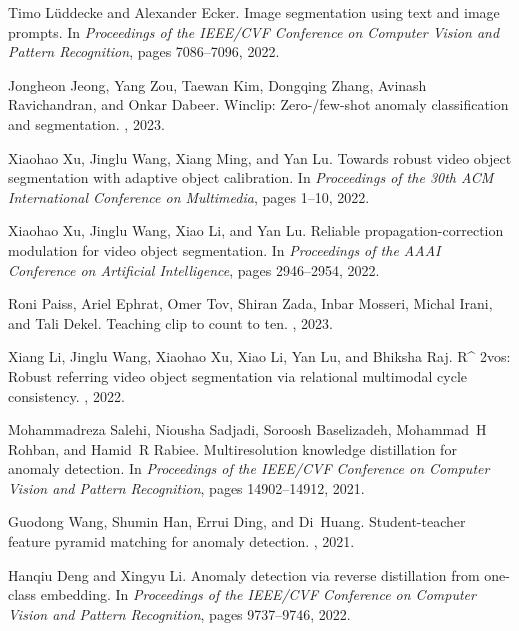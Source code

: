 \documentclass{article}
\begin{document}
{\begin{thebibliography}{10}
Timo L{\"u}ddecke and Alexander Ecker.
\newblock Image segmentation using text and image prompts.
\newblock In {\em Proceedings of the IEEE/CVF Conference on Computer Vision and
  Pattern Recognition}, pages 7086--7096, 2022.

Jongheon Jeong, Yang Zou, Taewan Kim, Dongqing Zhang, Avinash Ravichandran, and
  Onkar Dabeer.
\newblock Winclip: Zero-/few-shot anomaly classification and segmentation.
, 2023.

Xiaohao Xu, Jinglu Wang, Xiang Ming, and Yan Lu.
\newblock Towards robust video object segmentation with adaptive object
  calibration.
\newblock In {\em Proceedings of the 30th ACM International Conference on
  Multimedia}, pages 1--10, 2022.

Xiaohao Xu, Jinglu Wang, Xiao Li, and Yan Lu.
\newblock Reliable propagation-correction modulation for video object
  segmentation.
\newblock In {\em Proceedings of the AAAI Conference on Artificial
  Intelligence}, pages 2946--2954, 2022.

Roni Paiss, Ariel Ephrat, Omer Tov, Shiran Zada, Inbar Mosseri, Michal Irani,
  and Tali Dekel.
\newblock Teaching clip to count to ten.
, 2023.

Xiang Li, Jinglu Wang, Xiaohao Xu, Xiao Li, Yan Lu, and Bhiksha Raj.
\newblock R\^{} 2vos: Robust referring video object segmentation via relational
  multimodal cycle consistency.
, 2022.

Mohammadreza Salehi, Niousha Sadjadi, Soroosh Baselizadeh, Mohammad~H Rohban,
  and Hamid~R Rabiee.
\newblock Multiresolution knowledge distillation for anomaly detection.
\newblock In {\em Proceedings of the IEEE/CVF Conference on Computer Vision and
  Pattern Recognition}, pages 14902--14912, 2021.

Guodong Wang, Shumin Han, Errui Ding, and Di~Huang.
\newblock Student-teacher feature pyramid matching for anomaly detection.
, 2021.

Hanqiu Deng and Xingyu Li.
\newblock Anomaly detection via reverse distillation from one-class embedding.
\newblock In {\em Proceedings of the IEEE/CVF Conference on Computer Vision and
  Pattern Recognition}, pages 9737--9746, 2022.


\end{thebibliography}}
\end{document}
